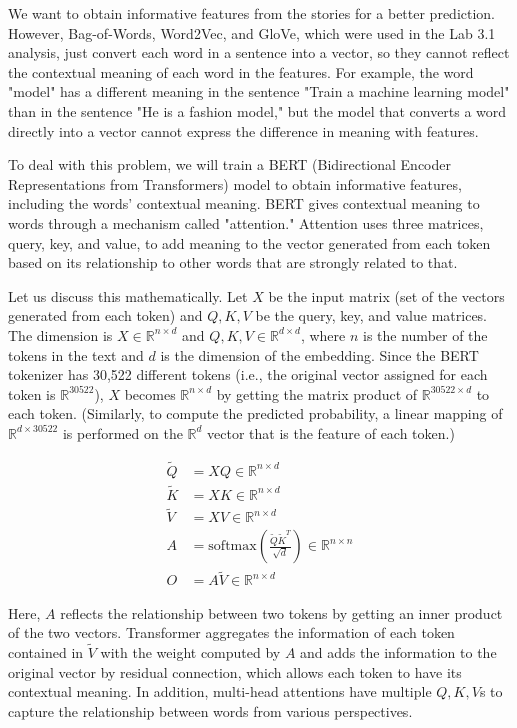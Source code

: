 \documentclass[12pt,letterpaper]{article}
\begin{document}
We want to obtain informative features from the stories for a better prediction. However, Bag-of-Words, Word2Vec, and GloVe, which were used in the Lab 3.1 analysis, just convert each word in a sentence into a vector, so they cannot reflect the contextual meaning of each word in the features. For example, the word "model" has a different meaning in the sentence "Train a machine learning model" than in the sentence "He is a fashion model," but the model that converts a word directly into a vector cannot express the difference in meaning with features.

To deal with this problem, we will train a BERT (Bidirectional Encoder Representations from Transformers) model to obtain informative features, including the words' contextual meaning. BERT gives contextual meaning to words through a mechanism called "attention." Attention uses three matrices, query, key, and value, to add meaning to the vector generated from each token based on its relationship to other words that are strongly related to that.

Let us discuss this mathematically. Let $X$ be the input matrix (set of the vectors generated from each token) and $Q, K, V$ be the query, key, and value matrices. The dimension is $X \in \mathbb{R}^{n \times d}$ and  $Q, K, V \in \mathbb{R}^{d \times d}$, where $n$ is the number of the tokens in the text and $d$ is the dimension of the embedding. Since the BERT tokenizer has 30,522 different tokens (i.e., the original vector assigned for each token is $\mathbb{R}^{30522}$), $X$ becomes $\mathbb{R}^{n \times d}$ by getting the matrix product of $\mathbb{R}^{30522 \times d}$ to each token. (Similarly, to compute the predicted probability, a linear mapping of $\mathbb{R}^{d \times 30522}$ is performed on the $\mathbb{R}^{d}$ vector that is the feature of each token.)

\begin{align*}
\tilde{Q} &= XQ \in \mathbb{R}^{n \times d}\\
\tilde{K} &= XK \in \mathbb{R}^{n \times d}\\
\tilde{V} &= XV \in \mathbb{R}^{n \times d}\\
A &= \text{softmax}\left(\frac{\tilde{Q}\tilde{K}^T}{\sqrt{d}}\right) \in \mathbb{R}^{n \times n}\\
O &= A\tilde{V} \in \mathbb{R}^{n \times d}
\end{align*}

Here, $A$ reflects the relationship between two tokens by getting an inner product of the two vectors. Transformer aggregates the information of each token contained in $\tilde{V}$ with the weight computed by $A$ and adds the information to the original vector by residual connection, which allows each token to have its contextual meaning. In addition, multi-head attentions have multiple $Q, K, V$s to capture the relationship between words from various perspectives.
\end{document}
